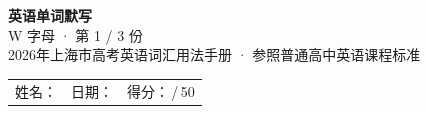 \documentclass[10pt,a4paper]{article}
\begin{document}
\pagestyle{plain}

\begin{center}
{\LARGE\bfseries 英语单词默写}\\[0.22em]
{\large W 字母 · 第 1 / 3 份}\\[0.18em]
{\small 2026年上海市高考英语词汇用法手册 · 参照普通高中英语课程标准}
\end{center}

\vspace{0.25em}
\noindent\begin{tabular}{@{}p{}@{}p{}@{}p{}@{}}
姓名：\underline{\hspace{2.0cm}} & 日期：\underline{\hspace{2.0cm}} & 得分：\underline{\hspace{1.3cm}}\,/\,50 \\
\end{tabular}

\vspace{0.3em}

\vspace{0.08em}
\end{document}
